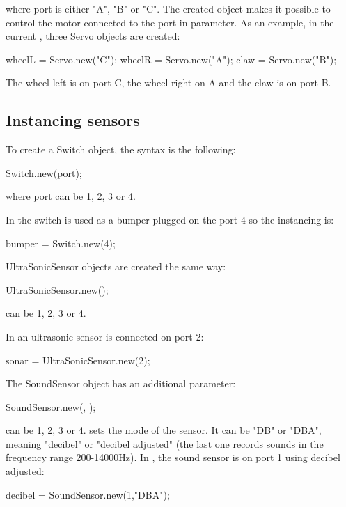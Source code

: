where port is either "A", "B" or "C". The created object makes it possible
to control the motor connected to the port in parameter.  As an example, in
the current , three Servo objects are created:
\begin{urbiunchecked}
wheelL = Servo.new("C");
wheelR = Servo.new("A");
claw = Servo.new("B");
\end{urbiunchecked}

The wheel left is on port C, the wheel right on A and the claw is on port B.

\subsection{Instancing sensors}
To create a Switch object, the syntax is the following:
\begin{urbiunchecked}
Switch.new(port);
\end{urbiunchecked}

where port can be 1, 2, 3 or 4.

In  the switch is used as a bumper plugged on the port 4 so
the instancing is:
\begin{urbiunchecked}
  bumper  = Switch.new(4);
\end{urbiunchecked}

UltraSonicSensor objects are created the same way:
\begin{urbiunchecked}
UltraSonicSensor.new();
\end{urbiunchecked}

 can be 1, 2, 3 or 4.

In  an ultrasonic sensor is connected on port 2:
\begin{urbiunchecked}
sonar = UltraSonicSensor.new(2);
\end{urbiunchecked}

The SoundSensor object has an additional parameter:
\begin{urbiunchecked}
SoundSensor.new(, );
\end{urbiunchecked}

 can be 1, 2, 3 or 4.   sets the mode of the sensor. It
can be "DB" or "DBA", meaning "decibel" or "decibel adjusted" (the last one
records sounds in the frequency range 200-14000Hz).  In , the
sound sensor is on port 1 using decibel adjusted:
\begin{urbiunchecked}
decibel = SoundSensor.new(1,"DBA");
\end{urbiunchecked}

